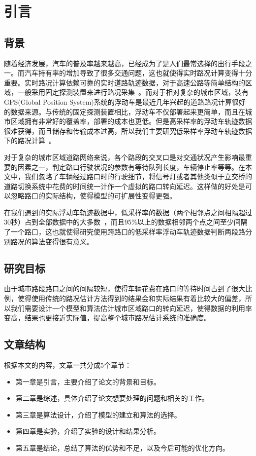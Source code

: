 \chapter{引言}
\label{chp1}

\section{背景}

随着经济发展，汽车的普及率越来越高，已经成为了是人们最常选择的出行手段之一。而汽车持有率的增加导致了很多交通问题，这也就使得实时路况计算变得十分重要。实时路况计算依赖可靠的实时道路轨迹数据，对于高速公路等简单结构的区域，一般采用固定探测装置来进行路况采集~\cite{yuan2014network,wang2005real}。而对于相对复杂的城市区域，装有GPS(Global Position System)系统的浮动车是最近几年兴起的道路路况计算很好的数据来源。与传统的固定探测装置相比，浮动车不仅部署起来更简单，而且在城市区域拥有非常好的覆盖率，部署的成本也更低。但是高采样率的浮动车轨迹数据很难获得，而且储存和传输成本过高，所以我们主要研究低采样率浮动车轨迹数据下的路况计算~\cite{rahmani2010requirements,brockfeld2007benefits}。

对于复杂的城市区域道路网络来说，各个路段的交叉口是对交通状况产生影响最重要的因素之一，判定路口行驶状况的参数有等待队列长度，车辆停止率等等。在本文中，我们忽略了车辆经过路口时的行驶细节，将信号灯或者其他类似于立交桥的道路切换系统中花费的时间统一计作一个虚拟的路口转向延迟。这样做的好处是可以忽略路口的实际结构，使得模型的可扩展性变得更强。

在我们遇到的实际浮动车轨迹数据中，低采样率的数据（两个相邻点之间相隔超过30秒）占到全部数据中的大多数~\cite{yue2009urban}，而且95\%以上的数据相邻两个点之间至少间隔了一个路口，这也就使得研究使用跨路口的低采样率浮动车轨迹数据判断两段路分别路况的算法变得很有意义。

\section{研究目标}

由于城市路段路口之间的间隔较短，使得车辆花费在路口的等待时间占到了很大比例，使得使用传统的路况估计方法得到的结果会和实际结果有着比较大的偏差，所以我们需要设计一个模型和算法估计城市区域路口的转向延迟，使得数据的利用率变高，结果也更接近实际值，提高整个城市路况估计系统的准确度。

\section{文章结构}

根据本文的内容，文章一共分成5个章节：
\begin{itemize}

\item 第一章是引言，主要介绍了论文的背景和目标。
\item 第二章是综述，具体介绍了论文想要处理的问题和相关的工作。
\item 第三章是算法设计，介绍了模型的建立和算法的选择。
\item 第四章是实验，介绍了实验的设计和结果分析。
\item 第五章是结论，总结了算法的优势和不足，以及今后可能的优化方向。

\end{itemize}
